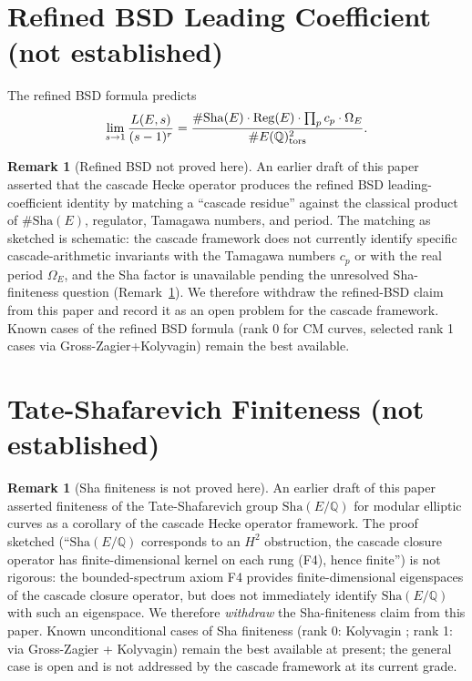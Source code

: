 \documentclass[11pt, a4paper]{amsart}
\theoremstyle{definition}
\newtheorem{remark}[theorem]{Remark}
\newcommand{\Q}{\mathbb{Q}}
\newcommand{\Sha}{\mathrm{Sha}}
\begin{document}
\section{Refined BSD Leading Coefficient (not established)}

The refined BSD formula predicts
\[
\lim_{s \to 1} \frac{L(E, s)}{(s-1)^r} = \frac{\#\Sha(E) \cdot \mathrm{Reg}(E) \cdot \prod_p c_p \cdot \Omega_E}{\#E(\Q)_{\rm tors}^2}.
\]

\begin{remark}[Refined BSD not proved here]\label{rmk:refBSD-withdrawn}
An earlier draft of this paper asserted that the cascade Hecke
operator produces the refined BSD leading-coefficient identity by
matching a ``cascade residue'' against the classical product of
$\#\Sha(E)$, regulator, Tamagawa numbers, and period. The
matching as sketched is schematic: the cascade framework does not
currently identify specific cascade-arithmetic invariants with
the Tamagawa numbers $c_p$ or with the real period $\Omega_E$, and
the Sha factor is unavailable pending the unresolved
Sha-finiteness question (Remark~\ref{rmk:sha}). We therefore
withdraw the refined-BSD claim from this paper and record it as
an open problem for the cascade framework. Known cases of the
refined BSD formula (rank 0 for CM curves, selected rank 1 cases
via Gross-Zagier+Kolyvagin) remain the best available.
\end{remark}

\section{Tate-Shafarevich Finiteness (not established)}

\begin{remark}[Sha finiteness is not proved here]\label{rmk:sha}
An earlier draft of this paper asserted finiteness of the
Tate-Shafarevich group $\Sha(E/\Q)$ for modular elliptic curves as
a corollary of the cascade Hecke operator framework. The proof
sketched (``$\Sha(E/\Q)$ corresponds to an $H^2$ obstruction, the
cascade closure operator has finite-dimensional kernel on each rung
(F4), hence finite'') is not rigorous: the bounded-spectrum axiom
F4 provides finite-dimensional eigenspaces of the cascade closure
operator, but does not immediately identify $\Sha(E/\Q)$ with such
an eigenspace. We therefore \emph{withdraw} the Sha-finiteness
claim from this paper. Known unconditional cases of Sha
finiteness (rank 0: Kolyvagin \cite{Kolyvagin1988}; rank 1: via
Gross-Zagier + Kolyvagin) remain the best available at present;
the general case is open and is not addressed by the cascade
framework at its current grade.
\end{remark}
\end{document}
